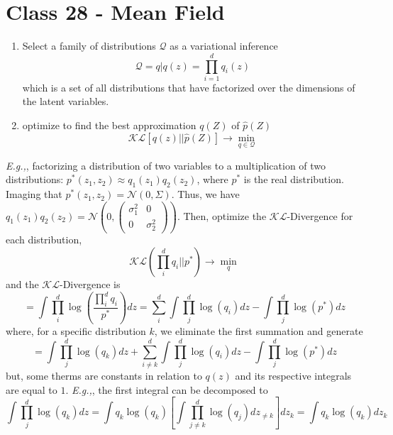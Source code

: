 \documentclass{article}
\newcommand{\Eg}{\textit{E.g.,}}
\begin{document}
\section{Class 28 - Mean Field}
\begin{enumerate}
    \item Select a family of distributions $\mathcal{Q}$ as a variational inference
    \begin{equation}
        \mathcal{Q} = {q|q(z) = \prod_{i=1}^d q_i(z)}
    \end{equation}
    which is a set of all distributions that have factorized over the dimensions of the latent variables.
    \item optimize to find the best approximation $q(Z)$ of $\hat{p}(Z)$
    \begin{equation}
        \mathcal{KL}[q(z)||\hat{p}(Z)] \rightarrow \min_{q \in \mathcal{Q}}
    \end{equation}
\end{enumerate}
\Eg, factorizing a distribution of two variables to a multiplication of two distributions: $p^*(z_1, z_2) \approx q_1(z_1)q_2(z_2)$, where $p^*$ is the real distribution. Imaging that $p^*(z_1, z_2) = \mathcal{N}(0, \Sigma)$. Thus, we have $q_1(z_1)q_2(z_2) = \mathcal{N}(0, \begin{pmatrix}
    \sigma_1^2 & 0\\
    0 & \sigma_2^2
\end{pmatrix})$. Then, optimize the $\mathcal{KL}$-Divergence for each distribution,
\begin{equation}
    \mathcal{KL}(\prod_i^d q_i||p^*) \rightarrow \min_q
\end{equation}
and the $\mathcal{KL}$-Divergence is
\begin{equation}
    = \int\prod_i^d \log\left(\frac{\prod_i^d q_i}{p^*} \right)dz = \sum_i^d \int\prod_j^d \log(q_i)dz - \int\prod_j^d \log(p^*)dz
\end{equation}
where, for a specific distribution $k$, we eliminate the first summation and generate 
\begin{equation}
    = \int\prod_j^d \log(q_k)dz + \sum_{i\neq k}^d \int\prod_j^d \log(q_i)dz - \int\prod_j^d \log(p^*)dz
\end{equation}
but, some therms are constants in relation to $q(z)$ and its respective integrals are equal to $1$. \Eg, the first integral can be decomposed to
\begin{equation}
    \int\prod_j^d \log(q_k)dz = \int q_k\log(q_k)\left[\int\prod_{j\neq k}^d \log(q_j)dz_{\neq k} \right]dz_k = \int q_k\log(q_k) dz_k
\end{equation}
\end{document}
